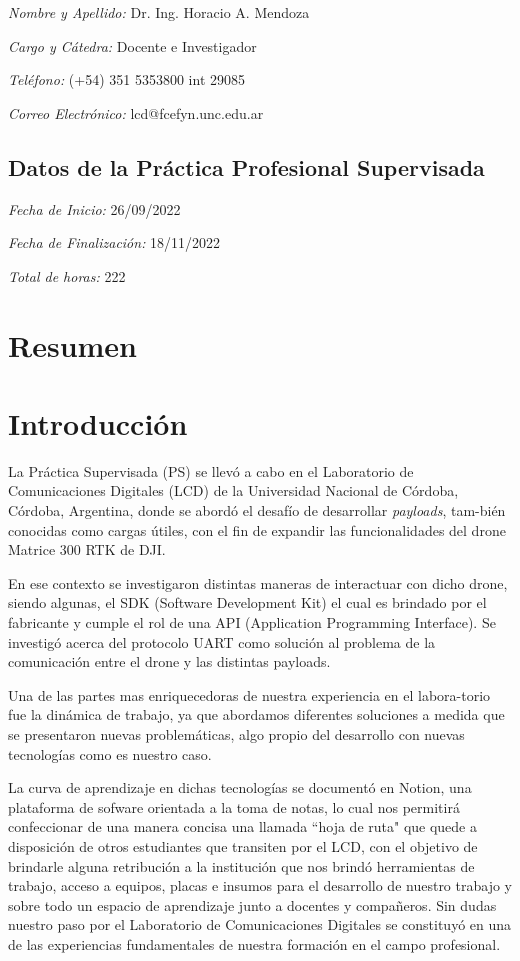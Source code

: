 \documentclass[12pt]{article}
\begin{document}
\textsl{Nombre y Apellido:} Dr. Ing. Horacio A. Mendoza

\textsl{Cargo y Cátedra:} Docente e Investigador

\textsl{Teléfono:} (+54) 351 5353800 int 29085

\textsl{Correo Electrónico:} lcd@fcefyn.unc.edu.ar

\subsection{Datos de la Práctica Profesional Supervisada}

\textsl{Fecha de Inicio:} 26/09/2022

\textsl{Fecha de Finalización:} 18/11/2022

\textsl{Total de horas:} 222

\tableofcontents
\newpage

\justifying
\section{Resumen}
\setlength\parindent{24pt}
\newpage
\section{Introducción}
La Práctica Supervisada (PS) se llevó a cabo en el Laboratorio de Comunicaciones Digitales (LCD) de la Universidad Nacional de Córdoba, Córdoba, Argentina, donde se abordó el desafío de desarrollar \textit{payloads}, tam-bién conocidas como cargas útiles, con el fin de expandir las funcionalidades del drone Matrice 300 RTK de DJI.

En ese contexto se investigaron distintas maneras de interactuar con dicho drone, siendo algunas, el SDK (Software Development Kit) el cual es brindado por el fabricante y cumple el rol de una API (Application Programming Interface). Se investigó acerca del protocolo UART como solución al problema de la comunicación entre el drone y las distintas payloads.

Una de las partes mas enriquecedoras de nuestra experiencia en el labora-torio fue la dinámica de trabajo, ya que abordamos diferentes soluciones a medida que se presentaron nuevas problemáticas, algo propio del desarrollo con nuevas tecnologías como es nuestro caso. 

La curva de aprendizaje en dichas tecnologías se documentó en Notion, una plataforma de sofware orientada a la toma de notas, lo cual nos permitirá confeccionar de una manera concisa una llamada ``hoja de ruta"  que quede a disposición de otros estudiantes que transiten por el LCD, con el objetivo de brindarle alguna retribución a la institución que nos brindó herramientas de trabajo, acceso a equipos, placas e insumos para el desarrollo de nuestro trabajo y sobre todo un espacio de aprendizaje junto a docentes y compañeros. Sin dudas nuestro paso por el Laboratorio de Comunicaciones Digitales se constituyó en una de las experiencias fundamentales de nuestra formación en el campo profesional.
\end{document}
